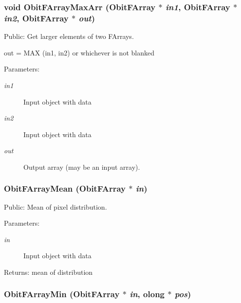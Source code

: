 \subsubsection{\setlength{\rightskip}{0pt plus 5cm}void Obit\-FArray\-Max\-Arr ({\bf Obit\-FArray} $\ast$ {\em in1}, {\bf Obit\-FArray} $\ast$ {\em in2}, {\bf Obit\-FArray} $\ast$ {\em out})}\label{ObitFArray_8h_a89}


Public: Get larger elements of two FArrays. 

out = MAX (in1, in2) or whichever is not blanked \begin{Desc}
\item[Parameters:]
\begin{description}
\item[{\em in1}]Input object with data \item[{\em in2}]Input object with data \item[{\em out}]Output array (may be an input array). \end{description}
\end{Desc}
\subsubsection{ Obit\-FArray\-Mean ({\bf Obit\-FArray} $\ast$ {\em in})}\label{ObitFArray_8h_a75}


Public: Mean of pixel distribution. 

\begin{Desc}
\item[Parameters:]
\begin{description}
\item[{\em in}]Input object with data \end{description}
\end{Desc}
\begin{Desc}
\item[Returns:]mean of distribution \end{Desc}
\subsubsection{ Obit\-FArray\-Min ({\bf Obit\-FArray} $\ast$ {\em in}, {\bf olong} $\ast$ {\em pos})}\label{ObitFArray_8h_a67}


